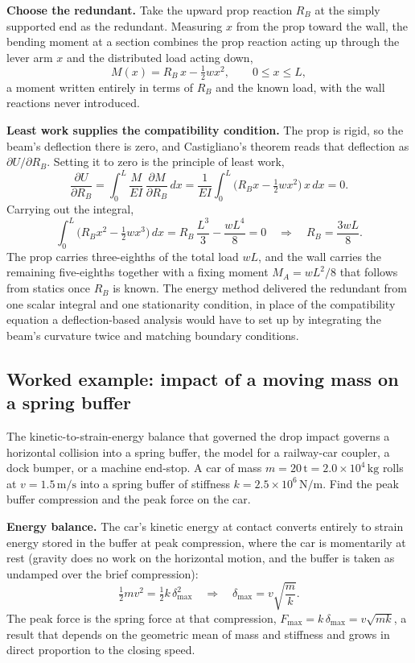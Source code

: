 \textbf{Choose the redundant.} Take the upward prop reaction $R_B$ at the
simply supported end as the redundant. Measuring $x$ from the prop toward the
wall, the bending moment at a section combines the prop reaction acting up
through the lever arm $x$ and the distributed load acting down,
\[
M(x) = R_B\,x - \tfrac12 w x^2,\qquad 0 \le x \le L,
\]
a moment written entirely in terms of $R_B$ and the known load, with the
wall reactions never introduced.

\textbf{Least work supplies the compatibility condition.} The prop is rigid,
so the beam's deflection there is zero, and Castigliano's theorem reads that
deflection as $\partial U/\partial R_B$. Setting it to zero is the principle
of least work,
\[
\frac{\partial U}{\partial R_B}
= \int_0^L \frac{M}{EI}\,\frac{\partial M}{\partial R_B}\,dx
= \frac{1}{EI}\int_0^L \bigl(R_B x - \tfrac12 w x^2\bigr)\,x\,dx = 0.
\]
Carrying out the integral,
\[
\int_0^L \bigl(R_B x^2 - \tfrac12 w x^3\bigr)\,dx
= R_B\,\frac{L^3}{3} - \frac{w L^4}{8} = 0
\quad\Longrightarrow\quad
R_B = \frac{3 w L}{8}.
\]
The prop carries three-eighths of the total load $wL$, and the wall carries
the remaining five-eighths together with a fixing moment $M_A = wL^2/8$ that
follows from statics once $R_B$ is known. The energy method delivered the
redundant from one scalar integral and one stationarity condition, in place
of the compatibility equation a deflection-based analysis would have to set
up by integrating the beam's curvature twice and matching boundary
conditions.

\subsection{Worked example: impact of a moving mass on a spring buffer}

The kinetic-to-strain-energy balance that governed the drop impact governs a
horizontal collision into a spring buffer, the model for a railway-car
coupler, a dock bumper, or a machine end-stop. A car of mass $m = 20\,
\si{\tonne} = 2.0\times 10^{4}\,\si{\kilogram}$ rolls at $v =
1.5\,\si{\meter\per\second}$ into a spring buffer of stiffness $k = 2.5\times
10^{6}\,\si{\newton\per\meter}$. Find the peak buffer compression and the
peak force on the car.

\textbf{Energy balance.} The car's kinetic energy at contact converts
entirely to strain energy stored in the buffer at peak compression, where
the car is momentarily at rest (gravity does no work on the horizontal
motion, and the buffer is taken as undamped over the brief compression):
\[
\tfrac12 m v^2 = \tfrac12 k\,\delta_\text{max}^2
\quad\Longrightarrow\quad
\delta_\text{max} = v\sqrt{\frac{m}{k}}.
\]
The peak force is the spring force at that compression, $F_\text{max} =
k\,\delta_\text{max} = v\sqrt{mk}$, a result that depends on the geometric
mean of mass and stiffness and grows in direct proportion to the closing
speed.

